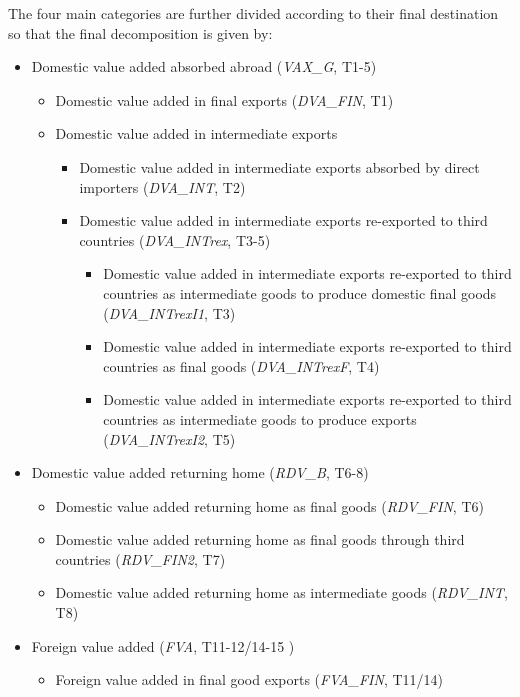 \documentclass[11pt,a4paper]{article}
\begin{document}
The four main categories are further divided according to their final destination so that the final decomposition is given by:

\begin{itemize}
\item Domestic value added absorbed abroad (\textit{VAX\_G}, T1-5)
\begin{itemize}
\item Domestic value added in final exports (\textit{DVA\_FIN}, T1)
\item Domestic value added in intermediate exports
\begin{itemize}
\item Domestic value added in intermediate exports absorbed by direct importers (\textit{DVA\_INT}, T2)
\item Domestic value added in intermediate exports re-exported to third countries (\textit{DVA\_INTrex}, T3-5)
\begin{itemize}
\item Domestic value added in intermediate exports re-exported to third countries as intermediate goods to produce domestic final goods (\textit{DVA\_INTrexI1}, T3)
\item Domestic value added in intermediate exports re-exported to third countries as  final goods (\textit{DVA\_INTrexF}, T4)
\item Domestic value added in intermediate exports re-exported to third countries as intermediate goods to produce exports (\textit{DVA\_INTrexI2}, T5)
\end{itemize}
\end{itemize}
\end{itemize}
\item Domestic value added returning home (\textit{RDV\_B}, T6-8)
\begin{itemize}
\item Domestic value added returning home as final goods (\textit{RDV\_FIN}, T6)
\item Domestic value added returning home as final goods through third countries (\textit{RDV\_FIN2}, T7)
\item Domestic value added returning home as intermediate goods (\textit{RDV\_INT}, T8)
\end{itemize}
\item Foreign value added (\textit{FVA}, T11-12/14-15 )
\begin{itemize}
\item Foreign value added in final good exports (\textit{FVA\_FIN}, T11/14)
\begin{itemize}

\end{itemize}
\end{itemize}
\end{itemize}
\end{document}
